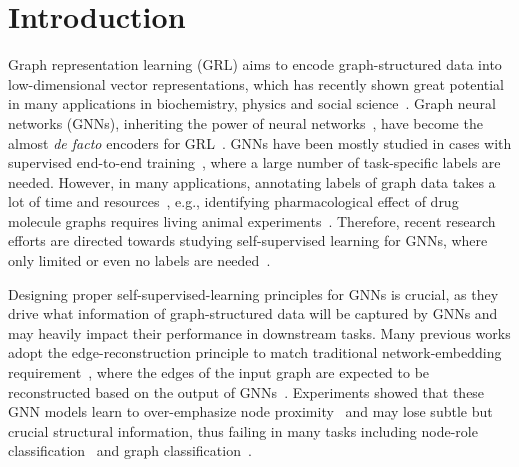 \section{Introduction}
\vspace{-2mm}
\label{sec:intro}
Graph representation learning (GRL) aims to encode graph-structured data into low-dimensional vector representations, which has recently shown great potential in many applications in biochemistry, physics and social science~\cite{senior2020improved,shlomi2020graph,hamilton2020book}. Graph neural networks (GNNs), inheriting the power of neural networks~\cite{hornik1989multilayer,cybenko1989approximation}, have become the almost {\em de facto} encoders for GRL~\cite{scarselli2008graph, chami2020machine, zhang2020deep_survey, hamilton2017representation}. GNNs have been mostly studied in  cases with supervised end-to-end training~\cite{kipf2016semi,dai2016discriminative,velickovic2018graph,zhang2018end,xu2018powerful,morris2019weisfeiler,li2020distance}, where a large number of task-specific labels are needed. However, in many applications, annotating labels of graph data takes a lot of time and resources~\cite{hu2019strategies,sun2019infograph}, e.g., identifying pharmacological effect of drug molecule graphs requires living animal experiments~\cite{vogel2002drug}. Therefore, recent research efforts are directed towards studying self-supervised learning for GNNs, where only limited or even no labels are needed~\cite{kipf2016variational,grover2019graphite,gmi,dgi,sun2019infograph,you2020graph, hassani2020contrastive, xie2021self, liu2021graph,zhang2020motif, thakoor2021bootstrapped,zhu2020graph,qiu2020gcc}. %

Designing proper self-supervised-learning principles for GNNs is crucial, as they drive what information of graph-structured data will be captured by  GNNs and may heavily impact their performance in downstream tasks. Many previous works adopt the edge-reconstruction principle to match traditional network-embedding requirement~\cite{belkin2003laplacian,perozzi2014deepwalk,grover2016node2vec,ribeiro2017struc2vec}, where the edges of the input graph are expected to be reconstructed based on the output of GNNs~\cite{hamilton2017inductive,kipf2016variational,grover2019graphite}. %
Experiments showed that these GNN models learn to over-emphasize node proximity~\cite{dgi} and may lose subtle but crucial structural information, thus failing in many tasks including node-role classification~\cite{henderson2012rolx,donnat2018learning,ribeiro2017struc2vec,li2020distance} and graph classification~\cite{hu2019strategies}. 
 
